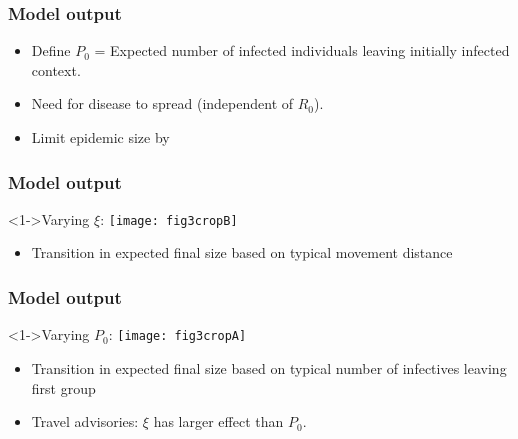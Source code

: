 \begin{frame}
  \frametitle{Model output}

  \begin{block}{}
    \begin{itemize}
    \item<1->
      Define $P_0$ = Expected number of infected individuals
      \alert{leaving} initially infected context.
    \item<2->
      Need  for disease to spread (independent of $R_0$).
    \item<3->
      Limit epidemic size by
    \end{itemize}
  \end{block}
  
\end{frame}

\begin{frame}
  \frametitle{Model output}
  
  \begin{block}<1->{Varying $\xi$:}
    \centering
    \texttt{[image: fig3cropB]}     
  \end{block}

  \begin{itemize}
  \item 
    Transition in expected final size based on typical
    movement distance 
  \end{itemize}
  
\end{frame}

\begin{frame}
  \frametitle{Model output}

  \begin{block}<1->{Varying $P_0$:}
    \centering
    \texttt{[image: fig3cropA]} 
  \end{block}

  \begin{itemize}
  \item 
    Transition in expected final size based on typical
    number of infectives leaving first group 
  \item<3->
    Travel advisories: $\xi$ has larger effect than $P_0$.
  \end{itemize}

\end{frame}


